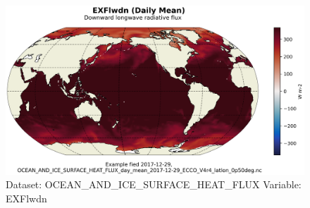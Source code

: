 \begin{figure}[H]
\centering
\includegraphics[scale=0.55]{../images/plots/latlon_plots/Ocean_and_Sea-Ice_Surface_Heat_Fluxes/EXFlwdn.png}
\caption{Dataset: OCEAN\_AND\_ICE\_SURFACE\_HEAT\_FLUX Variable: EXFlwdn}
\label{tab:table-OCEAN_AND_ICE_SURFACE_HEAT_FLUX_EXFlwdn-Plot}
\end{figure}
\pagebreak
